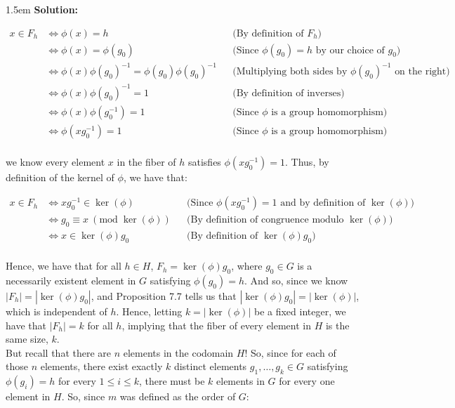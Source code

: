 \documentclass{article}
\newenvironment{solution}{
	\vspace{.5em}
	\par
	\begin{adjustwidth}{1.5em}{}
	\textbf{{Solution:}}
	\par
	\vspace{.5em}
}{
	\vspace{1em}
	\end{adjustwidth}
	\setcounter{step}{0}
	\newpage
}
\newcounter{step}
\renewcommand{\mod}[1]{\ (\text{mod} \; {#1})}
\begin{document}
\begin{solution}
	\begin{align*}
		x \in F_{h} &\iff \phi(x) = h &&\text{(By definition of $F_{h}$)} \\
		&\iff \phi(x) = \phi(g_{0}) &&\text{(Since $\phi(g_{0}) = h$ by our choice of $g_{0}$)} \\
		&\iff \phi(x)\phi(g_{0})^{-1} = \phi(g_{0})\phi(g_{0})^{-1} &&\text{(Multiplying both sides by $\phi(g_{0})^{-1}$ on the right)} \\
		&\iff \phi(x)\phi(g_{0})^{-1} = 1 &&\text{(By definition of inverses)} \\
		&\iff \phi(x)\phi(g_{0}^{-1}) = 1 &&\text{(Since $\phi$ is a group homomorphism)} \\
		&\iff \phi(xg_{0}^{-1}) = 1 &&\text{(Since $\phi$ is a group homomorphism)} \\
	\end{align*}

	we know every element $x$ in the fiber of $h$ satisfies $\phi(xg_{0}^{-1}) = 1$. Thus, by definition of the kernel of $\phi$, we have that:

	\begin{align*}
		x \in F_{h} &\iff xg_{0}^{-1} \in \ker(\phi) &&\text{(Since $\phi(xg_{0}^{-1}) = 1$ and by definition of $\ker(\phi)$)} \\
		&\iff g_{0} \equiv x \mod{\ker(\phi)} &&\text{(By definition of congruence modulo $\ker(\phi)$)} \\
		&\iff x \in \ker(\phi)g_{0} &&\text{(By definition of $\ker(\phi)g_{0}$)} \\
	\end{align*}

	Hence, we have that for all $h \in H$, $F_{h} = \ker(\phi)g_{0}$, where $g_{0} \in G$ is a necessarily existent element in $G$ satisfying $\phi(g_{0}) = h$. And so, since we know $|F_{h}| = |\ker(\phi)g_{0}|$, and Proposition 7.7 tells us that $|\ker(\phi)g_{0}| = |\ker(\phi)|$, which is independent of $h$. Hence, letting $k = |\ker(\phi)|$ be a fixed integer, we have that $|F_{h}| = k$ for all $h$, implying that the fiber of every element in $H$ is the same size, $k$. \\

	But recall that there are $n$ elements in the codomain $H$! So, since for each of those $n$ elements, there exist exactly $k$ distinct elements $g_{1}, \ldots, g_{k} \in G$ satisfying $\phi(g_{i}) = h$ for every $1 \le i \le k$, there must be $k$ elements in $G$ for every one element in $H$. So, since $m$ was defined as the order of $G$:


\end{solution}
\end{document}
